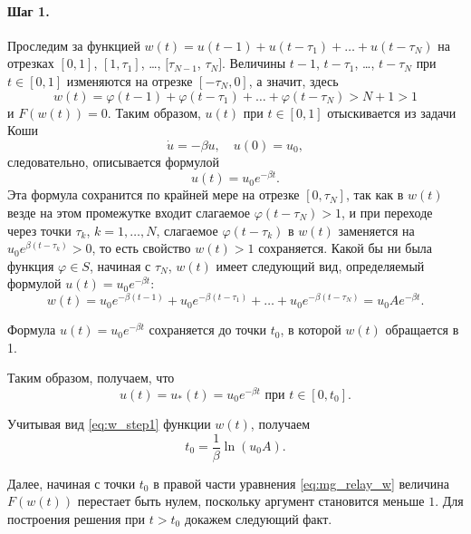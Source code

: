 \paragraph{Шаг 1.} 
Проследим за функцией $w(t)=u(t-1)+u(t-\tau_1)+\ldots+u(t-\tau_N)$ на отрезках $[0, 1]$, $[1, \tau_1]$, \dots, $[\tau_{N-1}$, $\tau_{N}]$. Величины $t - 1$, $t - \tau_1$, \dots, $t - \tau_N$ при $t \in [0,1]$ изменяются на отрезке $[-\tau_N,0]$, а значит, здесь 
%
\begin{equation*}
	w(t)=\varphi(t-1)+\varphi(t-\tau_1)+\ldots+\varphi(t -\tau_N) > N + 1 > 1
\end{equation*}
%
и $F(w(t)) = 0$. Таким образом, 
$u(t)$ при $t\in[0,1]$ отыскивается из задачи Коши 
%
\begin{equation*}
	\dot{u}=-\beta u,\quad u(0)=u_0,
\end{equation*}
%
следовательно, описывается формулой 
%
\begin{equation*}
	u(t)=u_0e^{-\beta t}.
\end{equation*}
%
Эта формула сохранится по крайней мере на отрезке $[0, \tau_N]$, так как в $w(t)$ везде на этом промежутке входит слагаемое $\varphi(t - \tau_N) > 1$, и при переходе через точки $\tau_k$, $k = 1, \ldots, N$, слагаемое $\varphi(t-\tau_k)$ в $w(t)$ заменяется на $u_0e^{\beta (t-\tau_k)} > 0$, то есть свойство $w(t) > 1$ сохраняется. Какой бы ни была функция $\varphi\in S$, начиная с $\tau_N$, $w(t)$ имеет следующий вид, определяемый формулой $u(t)=u_0e^{-\beta t}$:
\begin{equation}
	\label{eq:w_step1}
	w(t)=u_0 e^{-\beta(t-1)} + u_0 e^{-\beta(t-\tau_1)} + \ldots + u_0 e^{-\beta(t-\tau_N)}=u_0 A e^{-\beta t}.
\end{equation} 

Формула $u(t)=u_0 e^{-\beta t}$ сохраняется до точки $t_0$, в которой $w(t)$ обращается в 1.

Таким образом, получаем, что 
\begin{equation}
	\label{eq:u_step1}
	u(t)=u_*(t)=u_0e^{-\beta t} \text{ при }t\in[0, t_0].
\end{equation}

Учитывая вид \eqref{eq:w_step1} функции $w(t)$, получаем \begin{equation}
	\label{eq:t0}
	t_0 = \frac{1}{\beta}\ln(u_0 A).
\end{equation}

Далее, начиная с точки $t_0$ в правой части уравнения \eqref{eq:mg_relay_w} величина $F(w(t))$ перестает быть нулем, поскольку аргумент становится меньше $1$. Для построения решения при $t > t_0$ докажем следующий факт.

